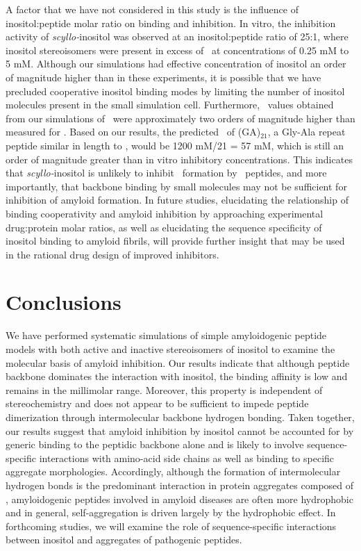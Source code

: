 A factor that we have not considered in this study is the influence of inositol:peptide molar ratio on binding and inhibition. In vitro, the inhibition activity of \textit{scyllo-}inositol was observed at an inositol:peptide ratio of 25:1, where inositol stereoisomers were present in excess of \abeta\ at concentrations of 0.25 mM to 5 mM.\cite{McLaurin:2000p64} Although our simulations had effective concentration of inositol an order of magnitude higher than in these experiments, it is possible that we have precluded cooperative inositol binding modes by limiting the number of inositol molecules present in the small simulation cell. Furthermore, \KD\ values obtained from our simulations of \gafour\ were approximately two orders of magnitude higher than measured for \abeta. Based on our results, the predicted \KD\ of (GA)$_{21}$, a Gly-Ala repeat peptide similar in length to \abeta, would be 1200 mM/21 = 57 mM, which is still an order of magnitude greater than in vitro inhibitory concentrations. This indicates that \textit{scyllo-}inositol is unlikely to inhibit \bsheet\ formation by \gafour\ peptides, and more importantly, that backbone binding by small molecules may not be sufficient for inhibition of amyloid formation. In future studies, elucidating the relationship of binding cooperativity and amyloid inhibition by approaching experimental drug:protein molar ratios, as well as elucidating the sequence specificity of inositol binding to amyloid fibrils, will provide further insight that may be used in the rational drug design of improved inhibitors.

\section{Conclusions}
We have performed systematic simulations of simple amyloidogenic peptide models with both active and inactive stereoisomers of inositol to examine the molecular basis of amyloid inhibition. Our results indicate that although peptide backbone dominates the interaction with inositol, the binding affinity is low and remains in the millimolar range. Moreover, this property is independent of stereochemistry and does not appear to be sufficient to impede peptide dimerization through intermolecular backbone hydrogen bonding. Taken together, our results suggest that amyloid inhibition by inositol cannot be accounted for by generic binding to the peptidic backbone alone and is likely to involve sequence-specific interactions with amino-acid side chains as well as binding to specific aggregate morphologies. Accordingly, although the formation of intermolecular hydrogen bonds is the predominant interaction in protein aggregates composed of \gafour, amyloidogenic peptides involved in amyloid diseases are often more hydrophobic and in general, self-aggregation is driven largely by the hydrophobic effect.\cite{Chiti:2006p20} In forthcoming studies, we will examine the role of sequence-specific interactions between inositol and aggregates of pathogenic peptides.

